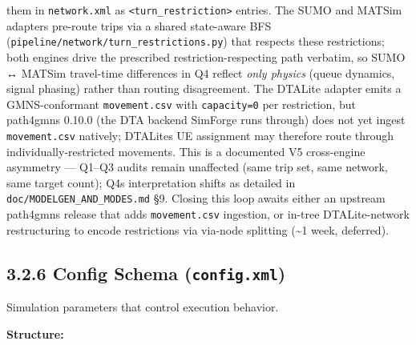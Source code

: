 \begin{itemize}
  them in \texttt{network.xml} as
  \texttt{\textless{}turn\_restriction\textgreater{}} entries. The SUMO
  and MATSim adapters pre-route trips via a shared state-aware BFS
  (\texttt{pipeline/network/turn\_restrictions.py}) that respects these
  restrictions; both engines drive the prescribed restriction-respecting
  path verbatim, so SUMO ↔ MATSim travel-time differences in Q4 reflect
  \emph{only physics} (queue dynamics, signal phasing) rather than
  routing disagreement. The DTALite adapter emits a GMNS-conformant
  \texttt{movement.csv} with \texttt{capacity=0} per restriction, but
  path4gmns 0.10.0 (the DTA backend SimForge runs through) does not yet
  ingest \texttt{movement.csv} natively; DTALite\textquotesingle s UE
  assignment may therefore route through individually-restricted
  movements. This is a documented V5 cross-engine asymmetry --- Q1--Q3
  audits remain unaffected (same trip set, same network, same target
  count); Q4\textquotesingle s interpretation shifts as detailed in
  \texttt{doc/MODELGEN\_AND\_MODES.md} §9. Closing this loop awaits
  either an upstream path4gmns release that adds \texttt{movement.csv}
  ingestion, or in-tree DTALite-network restructuring to encode
  restrictions via via-node splitting (\textasciitilde1 week, deferred).
\end{itemize}

\subsection{\texorpdfstring{3.2.6 Config Schema
(\texttt{config.xml})}{3.2.6 Config Schema (config.xml)}}\label{326-config-schema-configxml}

Simulation parameters that control execution behavior.

\textbf{Structure:}

\begin{Shaded}
\begin{Highlighting}[]
\NormalTok{\textless{}}\NormalTok{\textgreater{}}
\NormalTok{  \textless{}}\NormalTok{/\textgreater{}}
\NormalTok{  \textless{}}\NormalTok{/\textgreater{}}
\NormalTok{  \textless{}}\NormalTok{/\textgreater{}}
\NormalTok{  \textless{}}\NormalTok{/\textgreater{}}
\NormalTok{\textless{}/}\NormalTok{\textgreater{}}
\end{Highlighting}
\end{Shaded}

